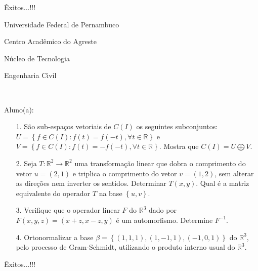\documentclass[oneside,a4paper,12pt]{article}
\newcommand{\universidade}{Universidade Federal de Pernambuco}
\newcommand{\centro}{Centro Acadêmico do Agreste}
\newcommand{\departamento}{Núcleo de Tecnologia}
\newcommand{\curso}{Engenharia Civil}
\begin{document}
	\flushbottom
	\flushright
     Êxitos...!!!
  \vspace{12pt}
  
     \begin{center}
     	\vspace{0pt}
     	
     	\universidade
     	\par
     	\centro
     	\par
     	\departamento
     	\par
     	\curso
     	\par
     	\vspace{08pt}
     	\\
     \end{center}
     
     \begin{flushleft}
     	Aluno(a):
     \end{flushleft}
 
 \begin{itemize}
 	\item[1.]  São sub-espaços vetoriais de $C(I)$ os seguintes subconjuntos: $U=\left\lbrace f\in C(I): f(t)=f(-t), \forall t\in \mathbb{R}\right\rbrace $ e $V= \left\lbrace f\in C(I): f(t)=-f(-t),\forall t\in \mathbb{R}\right\rbrace $. Mostra que $C(I)=U\bigoplus V$.
 \end{itemize}
 \begin{itemize}
 	\item[2.] Seja $T:\mathbb{R}^2\longrightarrow \mathbb{R}^2 $ uma transformação linear que dobra o comprimento do vetor $u=(2,1)$ e triplica o comprimento do vetor $v=(1,2)$, sem alterar as direções nem inverter os sentidos. Determinar $T(x,y)$. Qual é a matriz equivalente do operador $T$ na base $\left\lbrace u,v\right\rbrace$.
 \end{itemize}
 \begin{itemize}
 	\item [3.] Verifique que o operador linear $F$ do $\mathbb{R}^{3}$ dado por $F(x,y,z)=(x+z,x-z,y)$ é um automorfismo. Determine $F^{-1}$. 
 \end{itemize}
 \begin{itemize}
 	\item[4.] Ortonormalizar a base $\beta=\left\lbrace (1,1,1),(1,-1,1),(-1,0,1)\right\rbrace $ do $\mathbb{R}^{3}$, pelo processo de Gram-Schmidt, utilizando o produto interno usual do  $\mathbb{R}^{3}$. 
 	
 \end{itemize}
 
\flushbottom
\flushright
Êxitos...!!!
\end{document}

